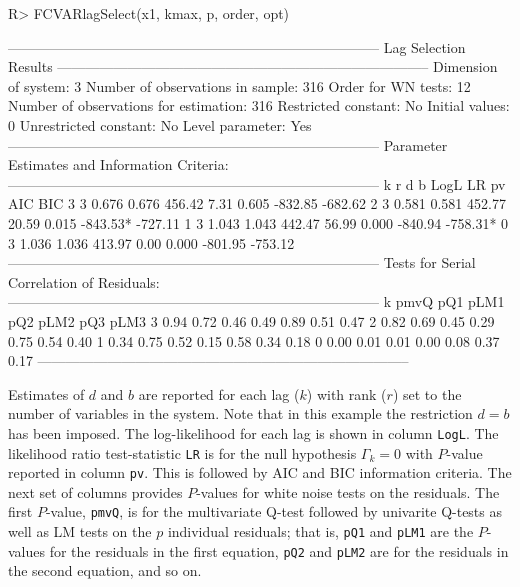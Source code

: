 \documentclass[article]{jss}
\begin{document}
\begin{CodeChunk} 
\begin{CodeInput}
R> FCVARlagSelect(x1, kmax, p, order, opt)
\end{CodeInput}
\begin{CodeOutput}
--------------------------------------------------------------------------------
                        Lag Selection Results 
--------------------------------------------------------------------------------
Dimension of system:       3     Number of observations in sample:          316 
Order for WN tests:       12     Number of observations for estimation:     316 
Restricted constant:      No     Initial values:                              0
Unrestricted constant:    No     Level parameter:                           Yes
--------------------------------------------------------------------------------
Parameter Estimates and Information Criteria:
--------------------------------------------------------------------------------
 k  r    d    b      LogL     LR    pv    AIC       BIC
 3  3 0.676 0.676  456.42   7.31 0.605  -832.85   -682.62 
 2  3 0.581 0.581  452.77  20.59 0.015  -843.53*  -727.11 
 1  3 1.043 1.043  442.47  56.99 0.000  -840.94   -758.31*
 0  3 1.036 1.036  413.97   0.00 0.000  -801.95   -753.12 
--------------------------------------------------------------------------------
Tests for Serial Correlation of Residuals: 
--------------------------------------------------------------------------------
 k   pmvQ  pQ1   pLM1  pQ2   pLM2  pQ3   pLM3
 3   0.94  0.72  0.46  0.49  0.89  0.51  0.47
 2   0.82  0.69  0.45  0.29  0.75  0.54  0.40
 1   0.34  0.75  0.52  0.15  0.58  0.34  0.18
 0   0.00  0.01  0.01  0.00  0.08  0.37  0.17
--------------------------------------------------------------------------------
\end{CodeOutput}
\end{CodeChunk} 

Estimates of $d$ and $b$ are reported for each lag ($k$) with rank ($r$) set to the number of variables in the system. Note that in this example the restriction $d=b$ has been imposed. The log-likelihood for each lag is shown in column \verb|LogL|. The likelihood ratio test-statistic \verb|LR| is for the null hypothesis $\Gamma_k = 0$ with $P$-value reported in column \verb|pv|. This is followed by AIC and BIC information criteria. The next set of columns provides $P$-values for white noise tests on the residuals. The first $P$-value, \verb|pmvQ|, is for the multivariate Q-test followed by univarite Q-tests as well as LM tests on the $p$ individual residuals; that is, \verb|pQ1| and \verb|pLM1| are the $P$-values for the residuals in the first equation, \verb|pQ2| and \verb|pLM2| are for the residuals in the second equation, and so on. 
\end{document}
